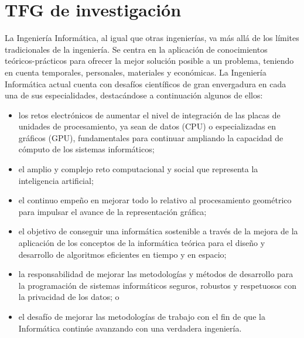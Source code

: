 \section{TFG de investigación}
\label{appendix:investigacion}



La Ingeniería Informática, al igual que otras ingenierías, va más allá de los límites tradicionales de la ingeniería. Se centra en la aplicación de conocimientos teóricos-prácticos para ofrecer la mejor solución posible a un problema, teniendo en cuenta temporales, personales, materiales y económicas. La Ingeniería Informática actual cuenta con desafíos científicos de gran envergadura en cada una de sus especialidades, destacándose a continuación algunos de ellos:
\begin{itemize}
    \item los retos electrónicos de aumentar el nivel de integración de las placas de unidades de procesamiento, ya sean de datos (CPU) o especializadas en gráficos (GPU), fundamentales para continuar ampliando la capacidad de cómputo de los sistemas informáticos;
    \item el amplio y complejo reto computacional y social que representa la inteligencia artificial;
    \item el continuo empeño en mejorar todo lo relativo al procesamiento geométrico para impulsar el avance de la representación gráfica;
    \item el objetivo de conseguir una informática sostenible a través de la mejora de la aplicación de los conceptos de la informática teórica para el diseño y desarrollo de algoritmos eficientes en tiempo y en espacio;
    \item la responsabilidad de mejorar las metodologías y métodos de desarrollo para la programación de sistemas informáticos seguros, robustos y respetuosos con la privacidad de los datos; o
    \item el desafío de mejorar las metodologías de trabajo con el fin de que la Informática continúe avanzando con una verdadera ingeniería.
\end{itemize}
